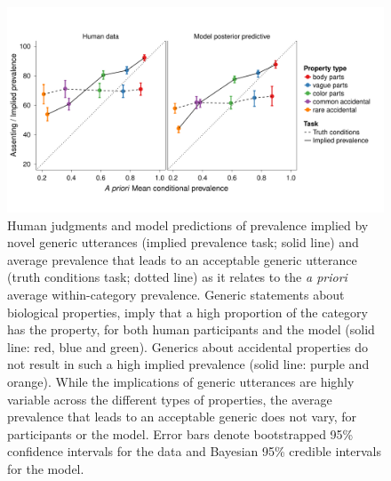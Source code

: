 \documentclass[10pt,letterpaper]{article}
\newcommand{\ndg}[1]{\textcolor{Green}{[ndg: #1]}}
\begin{document}
\begin{figure}
\centering
    \includegraphics[width=1\columnwidth]{asym-lines-data-model-2phi-2so-50kx3.pdf}
    \caption{Human judgments and model predictions of prevalence implied by novel generic utterances (implied prevalence task; solid line) and average prevalence that leads to an acceptable generic utterance (truth conditions task; dotted line) as it relates to the \emph{a priori} average within-category prevalence.
    Generic statements about biological properties, imply that a high proportion of the category has the property, for both human participants and the model (solid line: red, blue and green). 
    Generics about accidental properties do not result in such a high implied prevalence (solid line: purple and orange).  
	While the implications of generic utterances are highly variable across the different types of properties, the average prevalence that leads to an acceptable generic does not vary, for participants or the model.
    Error bars denote bootstrapped 95\% confidence intervals for the data and Bayesian 95\% credible intervals for the model.
}
  \label{fig:exp2b}
\end{figure}


\end{document}
